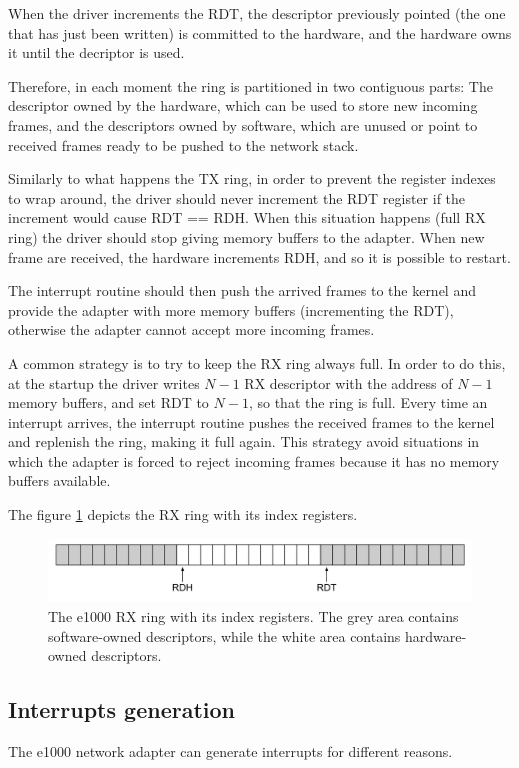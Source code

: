 When the driver increments the RDT, the descriptor previously pointed (the one that has just been written) is committed to the hardware,
and the hardware owns it until the decriptor is used.

Therefore, in each moment the ring is partitioned in two contiguous parts: The descriptor owned by the hardware, which can be
used to store new incoming frames, and the descriptors owned by software, which are unused or point to received frames ready to
be pushed to the network stack.

Similarly to what happens the TX ring, in order to prevent the register indexes to wrap around, the driver should never increment the RDT
register if the increment would cause RDT == RDH. When this situation happens (full RX ring) the driver should stop giving memory buffers to
the adapter. When new frame are received, the hardware increments RDH, and so it is possible to restart.

The interrupt routine should then push the arrived frames to the kernel and provide the adapter with more memory buffers (incrementing
the RDT), otherwise the adapter cannot accept more incoming frames.

A common strategy is to try to keep the RX ring always full. In order to do this, at the startup
the driver writes $N-1$ RX descriptor with the address of $N-1$ memory buffers, and set RDT to $N-1$, so that the ring is full.
Every time an interrupt arrives, the interrupt routine pushes the received frames to the kernel and replenish the ring, making it full again.
This strategy avoid situations in which the adapter is forced to reject incoming frames because it has no memory buffers available.

The figure \ref{fig:rxring} depicts the RX ring with its index registers.

\begin{figure}[bt]
\centering
\includegraphics[scale = 0.35]{rx-ring.pdf}
\caption{The e1000 RX ring with its index registers. The grey area contains software-owned descriptors, while the white area
	contains hardware-owned descriptors.}
\label{fig:rxring}
\end{figure}


\subsection{Interrupts generation}
\label{sec:e1000int}
The e1000 network adapter can generate interrupts for different reasons.

